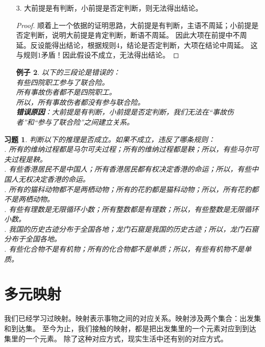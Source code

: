 \documentclass[12pt,UTF8]{ctexbook}
\newtheorem*{ex*}{例子}
\newtheorem{xt}{习题}[section]
\begin{document}
\begin{enumerate}
\begin{ex*}
        \indent 所以，所有绿色的东西都会腐烂。\\
        \textbf{错误原因}：小前提是有判断，所以结论应该是有判断。改为“有些绿色的东西会腐烂”则正确。
    \end{ex*}
    \item[3.] 大前提是有判断，小前提是否定判断，则无法得出结论。
    \begin{proof}
        顺着上一个依据的证明思路，大前提是有判断，主语不周延；小前提是否定判断，说明大前提是肯定判断，断语不周延。
        因此大项在前提中不周延。反设能得出结论，根据规则$4$，结论是否定判断，大项在结论中周延。
        这与规则$1$矛盾！因此假设不成立，无法得出结论。
    \end{proof}
    \begin{ex*}
        以下的三段论是错误的： \\
        \indent 有些四院职工参与了联合险。\\
        \indent 所有事故伤者都不是四院职工。\\
        \indent 所以，所有事故伤者都没有参与联合险。\\
        \textbf{错误原因}：大前提是有判断，小前提是否定判断，我们无法在“事故伤者”和“参与了联合险”之间建立关系。
    \end{ex*}
\end{enumerate}
\begin{xt}\label{xt:4-1-10}
    判断以下的推理是否成立。如果不成立，违反了哪条规则：\\
    . 所有的维纳过程都是马尔可夫过程；所有的维纳过程都是鞅；所以，有些马尔可夫过程是鞅。\\
    . 有些香港居民不是中国人；所有香港居民都有权决定香港的命运；所以，有些中国人无权决定香港的命运。\\
    . 所有的猫科动物都不是两栖动物；所有的花豹都是猫科动物；所以，所有花豹都不是两栖动物。\\
    . 有些有理数是无限循环小数；所有整数都是有理数；所以，有些整数是无限循环小数。\\
    . 我国的历史古迹分布于全国各地；龙门石窟是我国的历史古迹；所以，龙门石窟分布于全国各地。\\
    . 有些化合物不是有机物；所有的化合物都不是单质；所以，有些有机物不是单质。    
\end{xt}

\chapter{多元映射}
我们已经学习过映射。映射表示事物之间的对应关系。映射涉及两个集合：出发集和到达集。
至今为止，我们接触的映射，都是把出发集里的一个元素对应到到达集里的一个元素。
除了这种对应方式，现实生活中还有别的对应方式。
\end{document}
